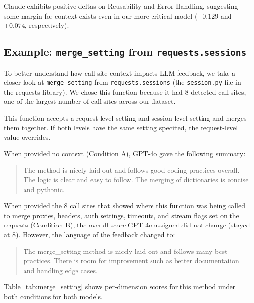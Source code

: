 \documentclass[12pt]{report}
\begin{document}
Claude exhibits positive deltas on Reusability and Error Handling, suggesting some margin for context exists even in our more critical model ($+0.129$ and $+0.074$, respectively).

\subsection{Example: \texttt{merge\_setting} from \texttt{requests.sessions}}

To better understand how call-site context impacts LLM feedback, we take a closer look at \texttt{merge\_setting} from \texttt{requests.sessions} (the \texttt{session.py} file in the requests library). We chose this function because it had 8 detected call sites, one of the largest number of call sites across our dataset.

This function accepts a request-level setting and session-level setting and merges them together. If both levels have the same setting specified, the request-level value overrides.

When provided no context (Condition A), GPT-4o gave the following summary:

\begin{quote}
The method is nicely laid out and follows good coding practices overall. The logic is clear and easy to follow. The merging of dictionaries is concise and pythonic.
\end{quote}

When provided the 8 call sites that showed where this function was being called to merge proxies, headers, auth settings, timeouts, and stream flags set on the requests (Condition B), the overall score GPT-4o assigned did not change (stayed at 8). However, the language of the feedback changed to:

\begin{quote}
The merge\_setting method is nicely laid out and follows many best practices. There is room for improvement such as better documentation and handling edge cases.
\end{quote}

Table~\ref{tab:merge_setting} shows per-dimension scores for this method under both conditions for both models.
\end{document}

